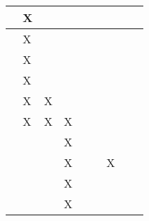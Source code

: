 \begin{longtable}{|l|llllllll|}
    \cite[]{Ningombam.2022}       & \multicolumn{1}{l|}{X}   & \multicolumn{1}{l|}{}     & \multicolumn{1}{l|}{}   & \multicolumn{1}{l|}{}   & \multicolumn{1}{l|}{}   & \multicolumn{1}{l|}{}   & \multicolumn{1}{l|}{}      \\ \hline
    \cite[]{Arulkumaran.2017}     & \multicolumn{1}{l|}{X}   & \multicolumn{1}{l|}{}     & \multicolumn{1}{l|}{}   & \multicolumn{1}{l|}{}   & \multicolumn{1}{l|}{}   & \multicolumn{1}{l|}{}   & \multicolumn{1}{l|}{}      \\ \hline
    \cite[]{Huang.2017}           & \multicolumn{1}{l|}{X}   & \multicolumn{1}{l|}{}     & \multicolumn{1}{l|}{}   & \multicolumn{1}{l|}{}   & \multicolumn{1}{l|}{}   & \multicolumn{1}{l|}{}   & \multicolumn{1}{l|}{}      \\ \hline
    \cite[]{Mnih.2013}            & \multicolumn{1}{l|}{X}   & \multicolumn{1}{l|}{}     & \multicolumn{1}{l|}{}   & \multicolumn{1}{l|}{}   & \multicolumn{1}{l|}{}   & \multicolumn{1}{l|}{}   & \multicolumn{1}{l|}{}      \\ \hline
    \cite[]{Wong.2022}            & \multicolumn{1}{l|}{X}   & \multicolumn{1}{l|}{X}    & \multicolumn{1}{l|}{}   & \multicolumn{1}{l|}{}   & \multicolumn{1}{l|}{}   & \multicolumn{1}{l|}{}   & \multicolumn{1}{l|}{}      \\ \hline
    \cite[]{Schuderer.2021}       & \multicolumn{1}{l|}{X}   & \multicolumn{1}{l|}{X}    & \multicolumn{1}{l|}{X}   & \multicolumn{1}{l|}{}   & \multicolumn{1}{l|}{}   & \multicolumn{1}{l|}{}   & \multicolumn{1}{l|}{}      \\ \hline
    \cite[]{Korber.2021}          & \multicolumn{1}{l|}{}   & \multicolumn{1}{l|}{}    & \multicolumn{1}{l|}{X}   & \multicolumn{1}{l|}{}   & \multicolumn{1}{l|}{}   & \multicolumn{1}{l|}{}   & \multicolumn{1}{l|}{}      \\ \hline
    \cite[]{Bharadhwaj.2019}      & \multicolumn{1}{l|}{}   & \multicolumn{1}{l|}{}    & \multicolumn{1}{l|}{X}   & \multicolumn{1}{l|}{}   & \multicolumn{1}{l|}{}   & \multicolumn{1}{l|}{X}   & \multicolumn{1}{l|}{}      \\ \hline
    \cite[]{Foronda.2021}         & \multicolumn{1}{l|}{}   & \multicolumn{1}{l|}{}    & \multicolumn{1}{l|}{X}   & \multicolumn{1}{l|}{}   & \multicolumn{1}{l|}{}   & \multicolumn{1}{l|}{}   & \multicolumn{1}{l|}{}      \\ \hline
    \cite[]{Maria.1997}           & \multicolumn{1}{l|}{}   & \multicolumn{1}{l|}{}    & \multicolumn{1}{l|}{X}   & \multicolumn{1}{l|}{}   & \multicolumn{1}{l|}{}   & \multicolumn{1}{l|}{}   & \multicolumn{1}{l|}{}      \\ \hline

\end{longtable}
